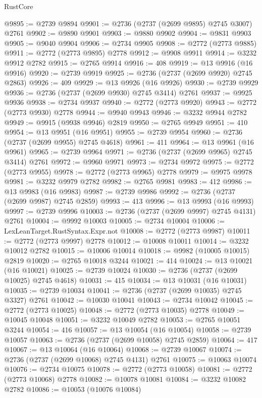 \begin{lexlean}{RustCore}
\begin{coremodule}
@9895 := @2739 @9894
@9901 := @2736 (@2737 (@2699 @9895) @2745 @3007) @2761
@9902 := @9890 @9901
@9903 := @9880 @9902
@9904 := @9831 @9903
@9905 := @9040 @9904
@9906 := @2734 @9905
@9908 := @2772 (@2773 @9885)
@9911 := @2772 (@2773 @9895) @2778
@9912 := @9908 @9911
@9914 := @3232 @9912 @2782
@9915 := @2765 @9914
@9916 := 408
@9919 := @13 @9916 (@16 @9916)
@9920 := @2739 @9919
@9925 := @2736 (@2737 (@2699 @9920) @2745 @2863)
@9926 := 409
@9929 := @13 @9926 (@16 @9926)
@9930 := @2739 @9929
@9936 := @2736 (@2737 (@2699 @9930) @2745 @3414) @2761
@9937 := @9925 @9936
@9938 := @2734 @9937
@9940 := @2772 (@2773 @9920)
@9943 := @2772 (@2773 @9930) @2778
@9944 := @9940 @9943
@9946 := @3232 @9944 @2782
@9949 := @9915 (@9938 @9946) @2819
@9950 := @2765 @9949
@9951 := 410
@9954 := @13 @9951 (@16 @9951)
@9955 := @2739 @9954
@9960 := @2736 (@2737 (@2699 @9955) @2745 @4618)
@9961 := 411
@9964 := @13 @9961 (@16 @9961)
@9965 := @2739 @9964
@9971 := @2736 (@2737 (@2699 @9965) @2745 @3414) @2761
@9972 := @9960 @9971
@9973 := @2734 @9972
@9975 := @2772 (@2773 @9955)
@9978 := @2772 (@2773 @9965) @2778
@9979 := @9975 @9978
@9981 := @3232 @9979 @2782
@9982 := @2765 @9981
@9983 := 412
@9986 := @13 @9983 (@16 @9983)
@9987 := @2739 @9986
@9992 := @2736 (@2737 (@2699 @9987) @2745 @2859)
@9993 := 413
@9996 := @13 @9993 (@16 @9993)
@9997 := @2739 @9996
@10003 := @2736 (@2737 (@2699 @9997) @2745 @4131) @2761
@10004 := @9992 @10003
@10005 := @2734 @10004
@10006 := LexLeanTarget.RustSyntax.Expr.not
@10008 := @2772 (@2773 @9987)
@10011 := @2772 (@2773 @9997) @2778
@10012 := @10008 @10011
@10014 := @3232 @10012 @2782
@10015 := @10006 @10014
@10018 := @9982 (@10005 @10015) @2819
@10020 := @2765 @10018 @3244
@10021 := 414
@10024 := @13 @10021 (@16 @10021)
@10025 := @2739 @10024
@10030 := @2736 (@2737 (@2699 @10025) @2745 @4618)
@10031 := 415
@10034 := @13 @10031 (@16 @10031)
@10035 := @2739 @10034
@10041 := @2736 (@2737 (@2699 @10035) @2745 @3327) @2761
@10042 := @10030 @10041
@10043 := @2734 @10042
@10045 := @2772 (@2773 @10025)
@10048 := @2772 (@2773 @10035) @2778
@10049 := @10045 @10048
@10051 := @3232 @10049 @2782
@10053 := @2765 @10051 @3244
@10054 := 416
@10057 := @13 @10054 (@16 @10054)
@10058 := @2739 @10057
@10063 := @2736 (@2737 (@2699 @10058) @2745 @2859)
@10064 := 417
@10067 := @13 @10064 (@16 @10064)
@10068 := @2739 @10067
@10074 := @2736 (@2737 (@2699 @10068) @2745 @4131) @2761
@10075 := @10063 @10074
@10076 := @2734 @10075
@10078 := @2772 (@2773 @10058)
@10081 := @2772 (@2773 @10068) @2778
@10082 := @10078 @10081
@10084 := @3232 @10082 @2782
@10086 := @10053 (@10076 @10084)

\end{coremodule}
\end{lexlean}
